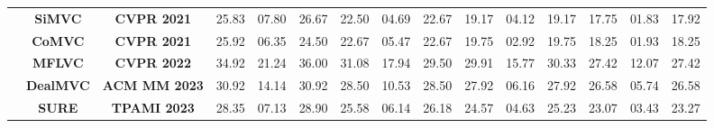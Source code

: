 \documentclass{article}
\theoremstyle{plain}
\theoremstyle{definition}
\theoremstyle{remark}
\begin{document}
\begin{table}[]
{\begin{tabular}{c|cc|ccc|ccc|ccc|ccc}
                            & \multicolumn{1}{c|}{\textbf{SiMVC}}   & \textbf{CVPR 2021}   & 25.83                                 & 07.80                                 & 26.67                                 & 22.50                                 & 04.69                                 & 22.67                                 & 19.17                                 & 04.12                                 & 19.17                                 & 17.75                                 & 01.83                                 & 17.92                                 \\
                            & \multicolumn{1}{c|}{\textbf{CoMVC}}   & \textbf{CVPR 2021}   & 25.92                                 & 06.35                                 & 24.50                                 & 22.67                                 & 05.47                                 & 22.67                                 & 19.75                                 & 02.92                                 & 19.75                                 & 18.25                                 & 01.93                                 & 18.25                                 \\
                            & \multicolumn{1}{c|}{\textbf{MFLVC}}   & \textbf{CVPR 2022}   & {\color[HTML]{3531FF} 34.92}          & {\color[HTML]{3531FF} 21.24}          & {\color[HTML]{3531FF} 36.00}          & {\color[HTML]{3531FF} 31.08}          & {\color[HTML]{3531FF} 17.94}          & {\color[HTML]{3531FF} 29.50}          & {\color[HTML]{3531FF} 29.91}          & {\color[HTML]{3531FF} 15.77}          & {\color[HTML]{3531FF} 30.33}          & {\color[HTML]{3531FF} 27.42}          & {\color[HTML]{3531FF} 12.07}          & {\color[HTML]{3531FF} 27.42}          \\
                            & \multicolumn{1}{c|}{\textbf{DealMVC}} & \textbf{ACM MM 2023} & 30.92                                 & 14.14                                 & 30.92                                 & 28.50                                 & 10.53                                 & 28.50                                 & 27.92                                 & 06.16                                 & 27.92                                 & 26.58                                 & 05.74                                 & 26.58                                 \\
                            & \multicolumn{1}{c|}{\textbf{SURE}}    & \textbf{TPAMI 2023}  & 28.35                                 & 07.13                                 & 28.90                                 & 25.58                                 & 06.14                                 & 26.18                                 & 24.57                                 & 04.63                                 & 25.23                                 & 23.07                                 & 03.43                                 & 23.27                                 \\

\end{tabular}}
\end{table}
\end{document}

